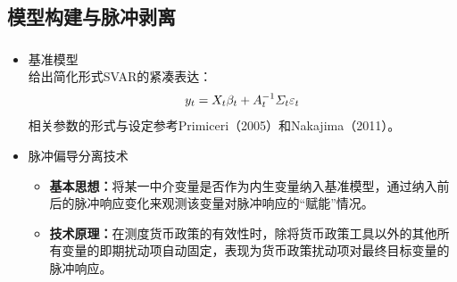 \documentclass[12pt,aspectratio=169]{ctexbeamer}
\begin{document}
			\subsection{模型构建与脉冲剥离}
			\begin{frame}
				\frametitle{}
				\begin{itemize}
					\item 基准模型\\
					\justifying
					{\normalsize
					给出简化形式SVAR的紧凑表达：
					\vspace{-3mm}
					\[
					y_t=X_t\beta _t+A_{t}^{-1}\varSigma _t\varepsilon _t
					\vspace{-3mm}
					\]
				    相关参数的形式与设定参考Primiceri（2005）和Nakajima（2011）。
					}
					\item 脉冲偏导分离技术
					\begin{itemize}
						\justifying
						\item \textbf{基本思想：}将某一中介变量是否作为内生变量纳入基准模型，通过纳入前后的脉冲响应变化来观测该变量对脉冲响应的“赋能”情况。
						\item \textbf{技术原理：}在测度货币政策的有效性时，除将货币政策工具以外的其他所有变量的即期扰动项自动固定，表现为货币政策扰动项对最终目标变量的脉冲响应。
					\end{itemize}
				\end{itemize}
			\end{frame}
\end{document}
